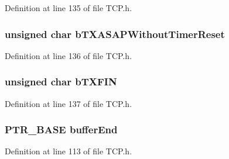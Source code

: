 Definition at line 135 of file T\+C\+P.\+h.

\hypertarget{struct_t_c_b___s_t_u_b_a00a53181aee4d79828ae8e52c06a7787}{}
\subsubsection[{b\+T\+X\+A\+S\+A\+P\+Without\+Timer\+Reset}]{\setlength{\rightskip}{0pt plus 5cm}unsigned char b\+T\+X\+A\+S\+A\+P\+Without\+Timer\+Reset}\label{struct_t_c_b___s_t_u_b_a00a53181aee4d79828ae8e52c06a7787}


Definition at line 136 of file T\+C\+P.\+h.

\hypertarget{struct_t_c_b___s_t_u_b_a2b4e5624c7ff0110540b0b87b484c636}{}
\subsubsection[{b\+T\+X\+F\+I\+N}]{\setlength{\rightskip}{0pt plus 5cm}unsigned char b\+T\+X\+F\+I\+N}\label{struct_t_c_b___s_t_u_b_a2b4e5624c7ff0110540b0b87b484c636}


Definition at line 137 of file T\+C\+P.\+h.

\hypertarget{struct_t_c_b___s_t_u_b_a56e0df836febac47f2f7f905f0641260}{}
\subsubsection[{buffer\+End}]{\setlength{\rightskip}{0pt plus 5cm}P\+T\+R\+\_\+\+B\+A\+S\+E buffer\+End}\label{struct_t_c_b___s_t_u_b_a56e0df836febac47f2f7f905f0641260}


Definition at line 113 of file T\+C\+P.\+h.

\hypertarget{struct_t_c_b___s_t_u_b_aee1387d217595a005d8b74e262d76db0}{}
